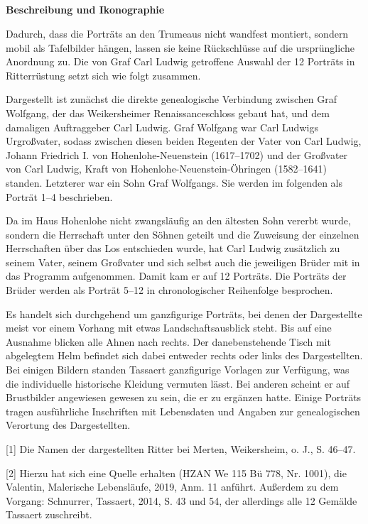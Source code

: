 \documentclass[
  letterpaper,
]{book}
\makeatletter
\let\oldsubparagraph\subparagraph
\renewcommand{\subparagraph}{
    \@ifstar
      \xxxSubParagraphStar
      \xxxSubParagraphNoStar
  }
\newcommand{\xxxSubParagraphStar}[1]{\oldsubparagraph*{#1}\mbox{}}
\newcommand{\xxxSubParagraphNoStar}[1]{\oldsubparagraph{#1}\mbox{}}
\makeatother
\begin{document}
\subparagraph{\texorpdfstring{\textbf{Beschreibung und
Ikonographie}}{Beschreibung und Ikonographie}}\label{beschreibung-und-ikonographie}

Dadurch, dass die Porträts an den Trumeaus nicht wandfest montiert,
sondern mobil als Tafelbilder hängen, lassen sie keine Rückschlüsse auf
die ursprüngliche Anordnung zu. Die von Graf Carl Ludwig getroffene
Auswahl der 12 Porträts in Ritterrüstung setzt sich wie folgt zusammen.

Dargestellt ist zunächst die direkte genealogische Verbindung zwischen
Graf Wolfgang, der das Weikersheimer Renaissanceschloss gebaut hat, und
dem damaligen Auftraggeber Carl Ludwig. Graf Wolfgang war Carl Ludwigs
Urgroßvater, sodass zwischen diesen beiden Regenten der Vater von Carl
Ludwig, Johann Friedrich I. von Hohenlohe-Neuenstein (1617--1702) und
der Großvater von Carl Ludwig, Kraft von Hohenlohe-Neuenstein-Öhringen
(1582--1641) standen. Letzterer war ein Sohn Graf Wolfgangs. Sie werden
im folgenden als Porträt 1--4 beschrieben.

Da im Haus Hohenlohe nicht zwangsläufig an den ältesten Sohn vererbt
wurde, sondern die Herrschaft unter den Söhnen geteilt und die Zuweisung
der einzelnen Herrschaften über das Los entschieden wurde, hat Carl
Ludwig zusätzlich zu seinem Vater, seinem Großvater und sich selbst auch
die jeweiligen Brüder mit in das Programm aufgenommen. Damit kam er auf
12 Porträts. Die Porträts der Brüder werden als Porträt 5--12 in
chronologischer Reihenfolge besprochen.

Es handelt sich durchgehend um ganzfigurige Porträts, bei denen der
Dargestellte meist vor einem Vorhang mit etwas Landschaftsausblick
steht. Bis auf eine Ausnahme blicken alle Ahnen nach rechts. Der
danebenstehende Tisch mit abgelegtem Helm befindet sich dabei entweder
rechts oder links des Dargestellten. Bei einigen Bildern standen
Tassaert ganzfigurige Vorlagen zur Verfügung, was die individuelle
historische Kleidung vermuten lässt. Bei anderen scheint er auf
Brustbilder angewiesen gewesen zu sein, die er zu ergänzen hatte. Einige
Porträts tragen ausführliche Inschriften mit Lebensdaten und Angaben zur
genealogischen Verortung des Dargestellten.

{[}1{]} Die Namen der dargestellten Ritter bei Merten, Weikersheim, o.
J., S. 46--47.

{[}2{]} Hierzu hat sich eine Quelle erhalten (HZAN We 115 Bü 778, Nr.
1001), die Valentin, Malerische Lebensläufe, 2019, Anm. 11 anführt.
Außerdem zu dem Vorgang: Schnurrer, Tassaert, 2014, S. 43 und 54, der
allerdings alle 12 Gemälde Tassaert zuschreibt.
\end{document}
